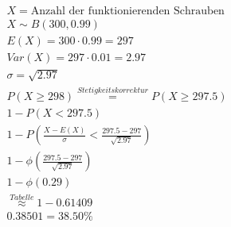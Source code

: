 \begin{align*}
    X = \text{Anzahl der funktionierenden Schrauben}                 \\
    X \sim B(300, 0.99)                                              \\
    E(X) = 300 \cdot 0.99 = 297                                      \\
    Var(X) = 297 \cdot 0.01 = 2.97                                   \\
    \sigma = \sqrt{2.97}                                             \\
    P(X \geq 298) \overset{Stetigkeitskorrektur}{=} P(X \geq 297.5)  \\
    1 - P(X < 297.5)                                                 \\
    1 - P(\frac{X - E(X)}{\sigma} < \frac{297.5 - 297}{\sqrt{2.97}}) \\
    1 - \phi(\frac{297.5 - 297}{\sqrt{2.97}})                        \\
    1 - \phi(0.29)                                                   \\
    \overset{Tabelle}{\approx} 1 - 0.61409                           \\
    0.38501 = 38.50\%
\end{align*}